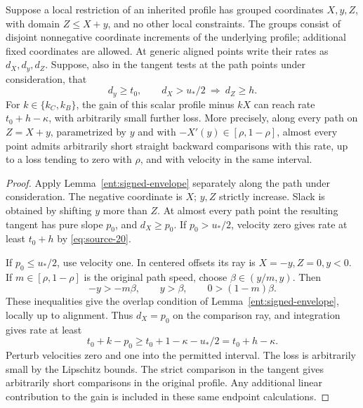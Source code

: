 \begin{lemma}\label{asp:scalar}
Suppose a local restriction of an inherited profile has grouped coordinates
\(X,y,Z\), with domain \(Z\le X+y\), and no other local constraints.
The groups consist of disjoint nonnegative coordinate increments of the
underlying profile; additional fixed coordinates are allowed. At generic
aligned points write their rates as \(d_X,d_y,d_Z\). Suppose, also in the
tangent tests at the path points under consideration, that
\begin{equation}\label{eq:source-20}
d_y\ge t_0,
\qquad d_X>u_*/2\ \Longrightarrow\ d_Z\ge h.
\end{equation}
For \(k\in\{k_C,k_B\}\), the gain of this scalar profile minus \(kX\)
can reach rate \(t_0+h-\kappa\), with arbitrarily small further loss.
More precisely, along every path on \(Z=X+y\), parametrized by \(y\)
and with \(-X'(y)\in[\rho,1-\rho]\), almost every point admits arbitrarily short
straight backward comparisons with this rate, up to a loss tending to zero
with \(\rho\), and with velocity in the same interval.
\end{lemma}

\begin{proof}
Apply Lemma~\ref{ent:signed-envelope} separately along the path under
consideration. The negative coordinate is \(X\); \(y,Z\) strictly
increase. Slack is obtained by shifting \(y\) more than \(Z\).
At almost every path point the resulting tangent has pure slope \(p_0\),
and \(d_X\ge p_0\). If \(p_0>u_*/2\), velocity zero gives rate at least
\(t_0+h\) by \eqref{eq:source-20}.

If \(p_0\le u_*/2\), use velocity one. In centered offsets its ray is
\(X=-y,Z=0,y<0\). If \(m\in[\rho,1-\rho]\) is the original path speed,
choose \(\beta\in(y/m,y)\). Then
\[
-y>-m\beta,\qquad y>\beta,\qquad0>(1-m)\beta.
\]
These inequalities give the overlap condition of
Lemma~\ref{ent:signed-envelope}, locally up to alignment. Thus
\(d_X=p_0\) on the comparison ray, and integration gives rate at least
\[
t_0+k-p_0\ge t_0+1-\kappa-u_*/2=t_0+h-\kappa.
\]
Perturb velocities zero and one into the permitted interval. The loss is
arbitrarily small by the Lipschitz bounds. The strict comparison in the
tangent gives arbitrarily short comparisons in the original profile.
Any additional linear contribution to the gain is included in these same
endpoint calculations.
\end{proof}

